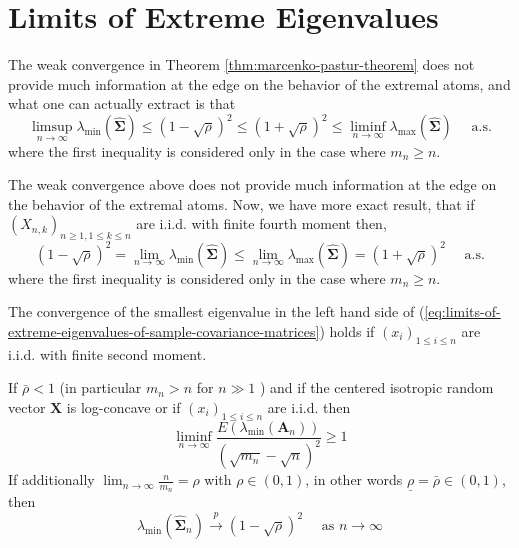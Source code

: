 \section{Limits of Extreme Eigenvalues}

The weak convergence in Theorem \ref{thm:marcenko-pastur-theorem} does not provide much information at the edge on the behavior of the extremal atoms, and what one can actually extract is that
\begin{equation}
    \limsup_{n\rightarrow\infty}\lambda_{\min}\left(\widehat{\boldsymbol{\Sigma}}\right)\leq(1-\sqrt{\rho})^{2}\leq(1+\sqrt{\rho})^{2}\leq\liminf_{n\rightarrow\infty}\lambda_{\max}\left(\widehat{\boldsymbol{\Sigma}}\right)\quad\text{ a.s.}
\end{equation}
where the first inequality is considered only in the case where $m_{n}\geq n$.

The weak convergence above does not provide much information at the edge on the behavior of the extremal atoms. Now, we have more exact result, that if $\left(X_{n,k}\right)_{n\geq 1,1\leq k\leq n}$ are i.i.d. with finite fourth moment then,
\begin{equation} \label{eq:limits-of-extreme-eigenvalues-of-sample-covariance-matrices}
    (1-\sqrt{\rho})^{2}=\lim_{n\rightarrow\infty}\lambda_{\min}\left(\widehat{\boldsymbol{\Sigma}}\right)\leq\lim_{n\rightarrow\infty}\lambda_{\max}\left(\widehat{\boldsymbol{\Sigma}}\right)=(1+\sqrt{\rho})^{2}\quad\text{ a.s.}
\end{equation}
where the first inequality is considered only in the case where $m_{n}\geq n$.

\begin{remark}
    The convergence of the smallest eigenvalue in the left hand side of (\ref{eq:limits-of-extreme-eigenvalues-of-sample-covariance-matrices}) holds if $\left(x_{i}\right)_{1\leq i\leq n}$ are i.i.d. with finite second moment.
\end{remark}

\begin{theorem}
    If $\bar{\rho}<1$ (in particular $m_{n}>n$ for $n\gg 1$ ) and if the centered isotropic random vector $\mathbf{X}$ is log-concave or if $\left(x_{i}\right)_{1\leq i\leq n}$ are i.i.d. then
    \begin{equation}
        \liminf_{n\rightarrow\infty}\frac{E\left(\lambda_{\min}\left(\mathbf{A}_{n}\right)\right)}{\left(\sqrt{m_{n}}-\sqrt{n}\right)^{2}}\geq 1
    \end{equation}
    If additionally $\lim_{n\rightarrow\infty}\frac{n}{m_{n}}=\rho$ with $\rho \in(0,1)$, in other words $\underline{\rho}=\bar{\rho}\in(0,1)$, then
    \begin{equation}
        \lambda_{\min}\left(\widehat{\boldsymbol{\Sigma}}_{n}\right)\stackrel{p}{\longrightarrow}(1-\sqrt{\rho})^{2}\quad\text{ as }n\rightarrow\infty
    \end{equation}
\end{theorem}

